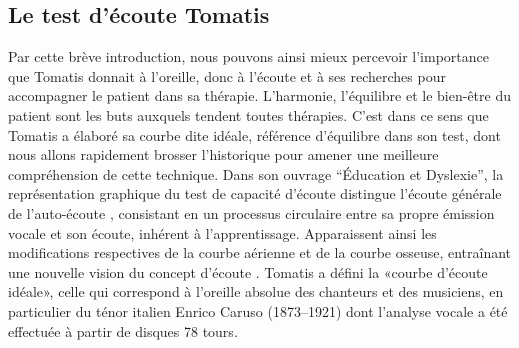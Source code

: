 
\subsection{Le test d'écoute Tomatis\textsuperscript \textregistered }
Par cette brève introduction, nous pouvons ainsi mieux percevoir l'importance que Tomatis donnait à l'oreille, donc à l'écoute et à ses recherches pour accompagner le patient dans sa thérapie.
L'harmonie, l'équilibre et le bien-être du patient sont les buts auxquels tendent  toutes thérapies. C'est 
dans ce sens que Tomatis a élaboré sa courbe dite idéale, référence d'équilibre dans son test, dont nous 
allons rapidement brosser l'historique pour amener une meilleure compréhension de cette technique.
Dans son ouvrage ``Éducation et
    Dyslexie''\autocite {tomatis:education}, la représentation graphique du
 test de capacité d'écoute distingue l'écoute générale de
 l'auto-écoute \autocite {Tomatislangage}, consistant  en un processus
   circulaire entre sa propre  émission vocale et son écoute, inhérent
   à l'apprentissage.
 Apparaissent ainsi les modifications respectives
 de la courbe aérienne et de la courbe osseuse, entraînant une nouvelle vision
 du concept d'écoute \autocite {tomatis_conf}.%
       Tomatis a défini la «courbe d'écoute idéale», celle qui correspond à l'oreille absolue
des chanteurs et des musiciens, en particulier du ténor italien Enrico
Caruso (1873--1921) dont l'analyse vocale a été effectuée à partir de
disques 78 tours. 


